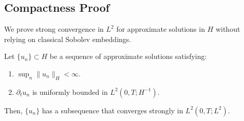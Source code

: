 \documentclass[12pt]{article}
\theoremstyle{definition}
\begin{document}
\subsection{Compactness Proof}
We prove strong convergence in $L^2$ for approximate solutions in $H$ without relying on classical Sobolev embeddings.

\begin{theorem}[Compactness in $H$]
Let $\{u_n\} \subset H$ be a sequence of approximate solutions satisfying:
\begin{enumerate}
    \item $\sup_n \|u_n\|_H < \infty$.
    \item $\partial_t u_n$ is uniformly bounded in $L^2(0, T; H^{-1})$.
\end{enumerate}
Then, $\{u_n\}$ has a subsequence that converges strongly in $L^2(0, T; L^2)$.
\end{theorem}
\end{document}
